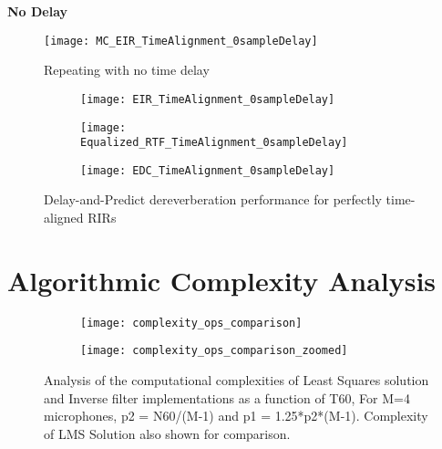 \textbf{No Delay}

\begin{figure}[H]
	\texttt{[image: MC\_EIR\_TimeAlignment\_0sampleDelay]}
	\centering
	\caption{Repeating with no time delay}
	\label{fig:params_MC_EIR_TimeAlignment_0sampleDelay}
\end{figure}

\begin{figure}[H]
	\centering
	\begin{subfigure}[b]{0.32\textwidth}
		\centering
		\texttt{[image: EIR\_TimeAlignment\_0sampleDelay]}
	\end{subfigure}
	\hfill
	\begin{subfigure}[b]{0.32\textwidth}
		\centering
		\texttt{[image: Equalized\_RTF\_TimeAlignment\_0sampleDelay]}
	\end{subfigure}
	\hfill
	\begin{subfigure}[b]{0.32\textwidth}
		\centering
		\texttt{[image: EDC\_TimeAlignment\_0sampleDelay]}
	\end{subfigure}
	\hfill
	\caption{Delay-and-Predict dereverberation performance for perfectly time-aligned RIRs}
	\label{fig:params_TimeAlignment_0sampleDelay}
\end{figure}



\section{Algorithmic Complexity Analysis}

\begin{figure}[H]
	\centering
	\begin{subfigure}[b]{0.45\textwidth}
		\centering
		\texttt{[image: complexity\_ops\_comparison]}
	\end{subfigure}
	\hfill
	\begin{subfigure}[b]{0.45\textwidth}
		\centering
		\texttt{[image: complexity\_ops\_comparison\_zoomed]}
	\end{subfigure}
	\caption{Analysis of the computational complexities of Least Squares solution and Inverse filter implementations as a function of T60, For M=4 microphones, p2 = N60/(M-1) and p1 = 1.25*p2*(M-1). Complexity of LMS Solution also shown for comparison.}
	\label{fig:complexity_operations}
\end{figure}

